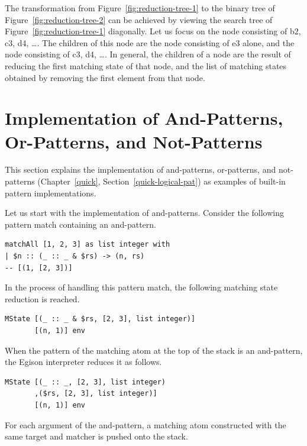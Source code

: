 The transformation from Figure~\ref{fig:reduction-tree-1} to the binary tree of Figure~\ref{fig:reduction-tree-2} can be achieved by viewing the search tree of Figure~\ref{fig:reduction-tree-1} diagonally.
Let us focus on the node consisting of b2, c3, d4, \ldots.
The children of this node are the node consisting of e3 alone, and the node consisting of c3, d4, \ldots.
In general, the children of a node are the result of reducing the first matching state of that node, and the list of matching states obtained by removing the first element from that node.

\section{Implementation of And-Patterns, Or-Patterns, and Not-Patterns}\label{mechanism-and-pat-or-pat}

This section explains the implementation of and-patterns, or-patterns, and not-patterns (Chapter~\ref{quick}, Section~\ref{quick-logical-pat}) as examples of built-in pattern implementations.

Let us start with the implementation of and-patterns.
Consider the following pattern match containing an and-pattern.
\begin{lstlisting}[language=egison,numbers=none]
matchAll [1, 2, 3] as list integer with
| $n :: (_ :: _ & $rs) -> (n, rs)
-- [(1, [2, 3])]
\end{lstlisting}
In the process of handling this pattern match, the following matching state reduction is reached.
\begin{lstlisting}[language=egison,numbers=none]
MState [(_ :: _ & $rs, [2, 3], list integer)]
       [(n, 1)] env
\end{lstlisting}
When the pattern of the matching atom at the top of the stack is an and-pattern, the Egison interpreter reduces it as follows.
\begin{lstlisting}[language=egison,numbers=none]
MState [(_ :: _, [2, 3], list integer)
       ,($rs, [2, 3], list integer)]
       [(n, 1)] env
\end{lstlisting}
For each argument of the and-pattern, a matching atom constructed with the same target and matcher is pushed onto the stack.


